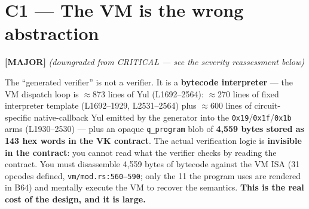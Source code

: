 \section{C1 --- The VM is the wrong abstraction}
\label{sec:c1-vm}
\textcolor{mathpurple}{\textbf{[MAJOR]}}  \emph{(downgraded from
CRITICAL --- see the severity reassessment below)}

The ``generated verifier'' is not a verifier. It is a
\textbf{bytecode interpreter} --- the VM dispatch loop is
$\approx$873 lines of Yul (L1692--2564): $\approx$270 lines of
fixed interpreter template (L1692--1929, L2531--2564) plus
$\approx$600 lines of circuit-specific native-callback Yul emitted
by the generator into the \texttt{0x19}/\texttt{0x1f}/\texttt{0x1b}
arms (L1930--2530) --- plus an
opaque \texttt{q\_program} blob of \textbf{4{,}559 bytes stored as
143 hex words in the VK contract}. The actual verification logic
is \textbf{invisible in the contract}: you cannot read what the
verifier checks by reading the contract. You must disassemble
4{,}559 bytes of bytecode against the VM ISA (31 opcodes defined,
\texttt{vm/\allowbreak{}mod.rs:560--590}; only the 11 the program uses are
rendered in B64) and mentally
execute the VM to recover the semantics. \textbf{This is the
real cost of the design, and it is large.}

